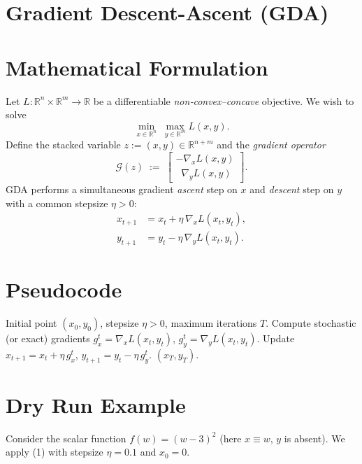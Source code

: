 \documentclass{article}
\newcommand{\R}{\mathbb{R}}
\begin{document}
\section*{Gradient Descent-Ascent (GDA)}

\section*{Mathematical Formulation}
Let $L:\R^{n}\times\R^{m}\rightarrow\R$ be a differentiable \emph{non‑convex–concave} objective.  
We wish to solve
\[
\min_{x\in\R^{n}}\;\max_{y\in\R^{m}} L(x,y).
\]
Define the stacked variable $z:=(x,y)\in\R^{n+m}$ and the \emph{gradient operator}
\[
\mathcal{G}(z)\;:=\;\begin{bmatrix}
-\nabla_{x}L(x,y)\\[2mm]
\;\;\nabla_{y}L(x,y)
\end{bmatrix}.
\]
GDA performs a simultaneous gradient \emph{ascent} step on $x$ and \emph{descent} step on $y$ with a common stepsize $\eta>0$:
\[
\boxed{
\begin{aligned}
x_{t+1} &= x_{t} + \eta\,\nabla_{x}L(x_{t},y_{t}),\\
y_{t+1} &= y_{t} - \eta\,\nabla_{y}L(x_{t},y_{t}).
\end{aligned}}
\tag{1}
\]

\section*{Pseudocode}
\begin{algorithm}[H]
\caption{Gradient Descent‑Ascent (GDA)}\label{alg:GDA}
\begin{algorithmic}[1]
\REQUIRE Initial point $(x_{0},y_{0})$, stepsize $\eta>0$, maximum iterations $T$.
    \STATE Compute stochastic (or exact) gradients 
        $g_{x}^{t}= \nabla_{x}L(x_{t},y_{t})$, 
        $g_{y}^{t}= \nabla_{y}L(x_{t},y_{t})$.
    \STATE Update 
        $x_{t+1}=x_{t}+ \eta\, g_{x}^{t}$,
        $y_{t+1}=y_{t}- \eta\, g_{y}^{t}$.
\ENDFOR
\RETURN $(x_{T},y_{T})$.
\end{algorithmic}
\end{algorithm}

\section*{Dry Run Example}
Consider the scalar function $f(w)=(w-3)^{2}$ (here $x\equiv w$, $y$ is absent).  
We apply (1) with stepsize $\eta=0.1$ and $x_{0}=0$.
\end{document}

